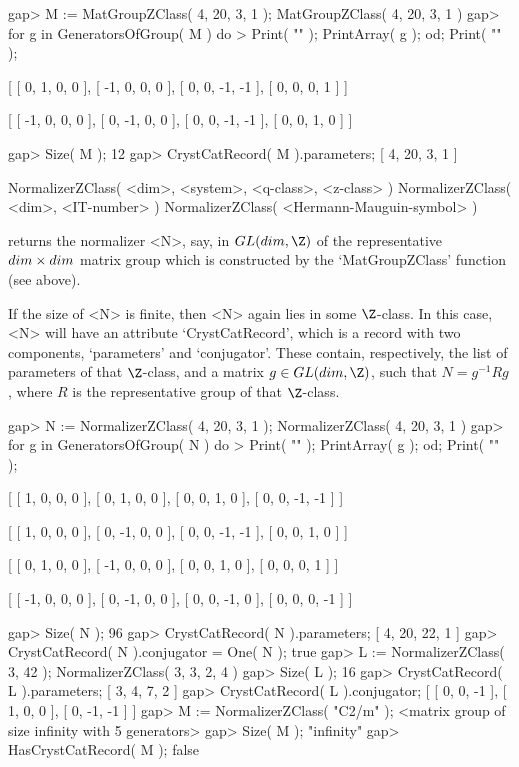 \beginexample
gap> M := MatGroupZClass( 4, 20, 3, 1 );
MatGroupZClass( 4, 20, 3, 1 )
gap> for g in GeneratorsOfGroup( M ) do
>  Print( "\n" ); PrintArray( g ); od; Print( "\n" );

[ [   0,   1,   0,   0 ],
  [  -1,   0,   0,   0 ],
  [   0,   0,  -1,  -1 ],
  [   0,   0,   0,   1 ] ]

[ [  -1,   0,   0,   0 ],
  [   0,  -1,   0,   0 ],
  [   0,   0,  -1,  -1 ],
  [   0,   0,   1,   0 ] ]

gap> Size( M );
12
gap> CrystCatRecord( M ).parameters;
[ 4, 20, 3, 1 ]
\endexample

\>NormalizerZClass( <dim>, <system>, <q-class>, <z-class> )
\>NormalizerZClass( <dim>, <IT-number> )
\>NormalizerZClass( <Hermann-Mauguin-symbol> )

returns the normalizer <N>, say, in $GL(dim,\Z)$ of the representative
$dim \times dim$ matrix group which is constructed by the
`MatGroupZClass' function (see above).

If the size of <N> is finite, then <N> again lies in some $\Z$-class.
In this case, <N> will have an attribute `CrystCatRecord',
which is a record with two components, `parameters' and `conjugator'.
These contain, respectively, the list of parameters of that
$\Z$-class, and a matrix $g \in GL(dim,\Z)$, such that $N = g^{-1} R g$,
where $R$ is the representative group of that $\Z$-class.

\beginexample
gap> N := NormalizerZClass( 4, 20, 3, 1 );
NormalizerZClass( 4, 20, 3, 1 )
gap> for g in GeneratorsOfGroup( N ) do
>  Print( "\n" ); PrintArray( g ); od; Print( "\n" );

[ [   1,   0,   0,   0 ],
  [   0,   1,   0,   0 ],
  [   0,   0,   1,   0 ],
  [   0,   0,  -1,  -1 ] ]

[ [   1,   0,   0,   0 ],
  [   0,  -1,   0,   0 ],
  [   0,   0,  -1,  -1 ],
  [   0,   0,   1,   0 ] ]

[ [   0,   1,   0,   0 ],
  [  -1,   0,   0,   0 ],
  [   0,   0,   1,   0 ],
  [   0,   0,   0,   1 ] ]

[ [  -1,   0,   0,   0 ],
  [   0,  -1,   0,   0 ],
  [   0,   0,  -1,   0 ],
  [   0,   0,   0,  -1 ] ]

gap> Size( N );
96
gap> CrystCatRecord( N ).parameters;
[ 4, 20, 22, 1 ]
gap> CrystCatRecord( N ).conjugator = One( N );
true
gap> L := NormalizerZClass( 3, 42 );
NormalizerZClass( 3, 3, 2, 4 )
gap> Size( L );
16
gap> CrystCatRecord( L ).parameters;
[ 3, 4, 7, 2 ]
gap> CrystCatRecord( L ).conjugator;
[ [ 0, 0, -1 ], [ 1, 0, 0 ], [ 0, -1, -1 ] ]
gap> M := NormalizerZClass( "C2/m" );
<matrix group of size infinity with 5 generators>
gap> Size( M );
"infinity"
gap> HasCrystCatRecord( M );
false
\endexample


